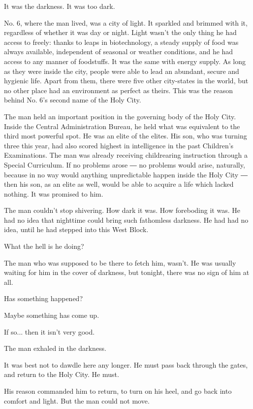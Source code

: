 It was the darkness. It was too dark.

No. 6, where the man lived, was a city of light. It sparkled and brimmed
with it, regardless of whether it was day or night. Light wasn't the
only thing he had access to freely: thanks to leaps in biotechnology, a
steady supply of food was always available, independent of seasonal or
weather conditions, and he had access to any manner of foodstuffs. It
was the same with energy supply. As long as they were inside the city,
people were able to lead an abundant, secure and hygienic life. Apart
from them, there were five other city-states in the world, but no other
place had an environment as perfect as theirs. This was the reason
behind No. 6's second name of the Holy City.

The man held an important position in the governing body of the Holy
City. Inside the Central Administration Bureau, he held what was
equivalent to the third most powerful spot. He was an elite of the
elites. His son, who was turning three this year, had also scored
highest in intelligence in the past Children's Examinations. The man was
already receiving childrearing instruction through a Special Curriculum.
If no problems arose ― no problems would arise, naturally, because in no
way would anything unpredictable happen inside the Holy City ― then his
son, as an elite as well, would be able to acquire a life which lacked
nothing. It was promised to him.

The man couldn't stop shivering. How dark it was. How foreboding it was.
He had no idea that nighttime could bring such fathomless darkness. He
had had no idea, until he had stepped into this West Block.

What the hell is he doing?

The man who was supposed to be there to fetch him, wasn't. He was
usually waiting for him in the cover of darkness, but tonight, there was
no sign of him at all.

Has something happened?

Maybe something has come up.

If so... then it isn't very good.

The man exhaled in the darkness.

It was best not to dawdle here any longer. He must pass back through the
gates, and return to the Holy City. He must.

His reason commanded him to return, to turn on his heel, and go back
into comfort and light. But the man could not move.

